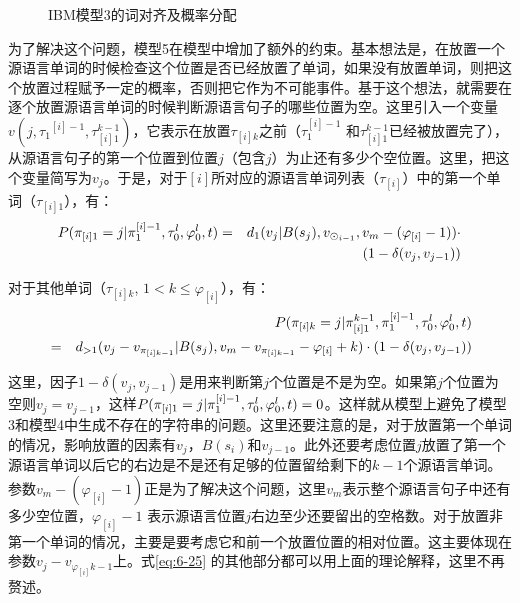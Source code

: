 \begin{figure}[htp]
    \centering

    \caption{IBM模型3的词对齐及概率分配}
    \label{fig:6-9}
\end{figure}

\parinterval 为了解决这个问题，模型5在模型中增加了额外的约束。基本想法是，在放置一个源语言单词的时候检查这个位置是否已经放置了单词，如果没有放置单词，则把这个放置过程赋予一定的概率，否则把它作为不可能事件。基于这个想法，就需要在逐个放置源语言单词的时候判断源语言句子的哪些位置为空。这里引入一个变量$v(j, {\tau_1}^{[i]-1}, \tau_{[i]1}^{k-1})$，它表示在放置$\tau_{[i]k}$之前（$\tau_1^{[i]-1}$ 和$\tau_{[i]1}^{k-1}$已经被放置完了），从源语言句子的第一个位置到位置$j$（包含$j$）为止还有多少个空位置。这里，把这个变量简写为$v_j$。于是，对于$[i]$所对应的源语言单词列表（$\tau_{[i]}$）中的第一个单词（$\tau_{[i]1}$），有：
\begin{eqnarray}
{P}(\pi_{[i]1} = j | \pi_1^{[i]-1}, \tau_0^l, \varphi_0^l, {t}) & = & d_1(v_j|B(s_j), v_{\odot_{i-1}}, v_m-(\varphi_{[i]}-1)) \cdot \nonumber \\
                                                                                                   &     & (1-\delta(v_j,v_{j-1}))
\label{eq:6-24}
\end{eqnarray}

\parinterval 对于其他单词（$\tau_{[i]k}$, $1 < k\le\varphi_{[i]}$），有：
\begin{eqnarray}
&   & {P}(\pi_{[i]k}=j|\pi_{[i]1}^{k-1}, \pi_1^{[i]-1}, \tau_0^l, \varphi_0^l,{t}) \nonumber \\
&= & d_{>1}(v_j-v_{\pi_{[i]k-1}}|B(s_j), v_m-v_{\pi_{[i]k-1}}-\varphi_{[i]}+k) \cdot (1-\delta(v_j,v_{j-1}))
\label{eq:6-25}
\end{eqnarray}

\noindent 这里，因子$1-\delta(v_j, v_{j-1})$是用来判断第$j$个位置是不是为空。如果第$j$个位置为空则$v_j = v_{j-1}$，这样${P}(\pi_{[i]1}=j|\pi_1^{[i]-1}, \tau_0^l, \varphi_0^l, {t}) = 0$。这样就从模型上避免了模型3和模型4中生成不存在的字符串的问题。这里还要注意的是，对于放置第一个单词的情况，影响放置的因素有$v_j$，$B(s_i)$和$v_{j-1}$。此外还要考虑位置$j$放置了第一个源语言单词以后它的右边是不是还有足够的位置留给剩下的$k-1$个源语言单词。参数$v_m-(\varphi_{[i]}-1)$正是为了解决这个问题，这里$v_m$表示整个源语言句子中还有多少空位置，$\varphi_{[i]}-1$ 表示源语言位置$j$右边至少还要留出的空格数。对于放置非第一个单词的情况，主要是要考虑它和前一个放置位置的相对位置。这主要体现在参数$v_j-v_{\varphi_{[i]}k-1}$上。式\eqref{eq:6-25} 的其他部分都可以用上面的理论解释，这里不再赘述。

